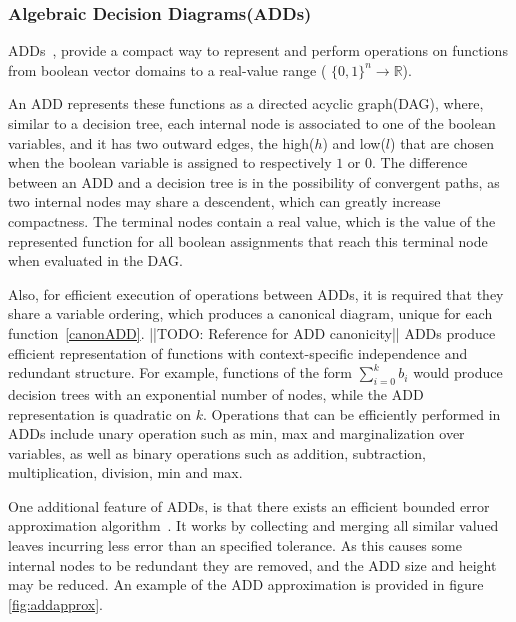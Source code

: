 \subsubsection{Algebraic Decision Diagrams(ADDs)} 

ADDs~\cite{bahar93add}, provide a compact way to represent and perform operations on functions from boolean vector domains to a real-value range ( $\{ 0, 1\}^n \rightarrow \mathbb{R}$). 

An ADD represents these functions as a directed acyclic graph(DAG), where, similar to a decision tree, each internal node is associated to one of the boolean variables, and it has two outward edges, the high($h$) and low($l$) that are chosen when the boolean variable is assigned to respectively $1$ or $0$. The difference between an ADD and a decision tree is in the possibility of convergent paths, as two internal nodes may share a descendent, which can greatly increase compactness. The terminal nodes contain a real value, which is the value of the represented function for all boolean assignments that reach this terminal node when evaluated in the DAG.

 Also, for efficient execution of operations between ADDs, it is required that they share a variable ordering, which produces a canonical diagram, unique for each function~\ref{canonADD}. ||TODO: Reference for ADD canonicity|| ADDs produce efficient representation of functions with context-specific independence and redundant structure. For example, functions of the form $\sum_{i=0}^k b_i$ would produce decision trees with an exponential number of nodes, while the ADD representation is quadratic on $k$. Operations that can be efficiently performed in ADDs include unary operation such as min, max and marginalization over variables, as well as binary operations such as addition, subtraction, multiplication, division, min and max.

One additional feature of ADDs, is that there exists an efficient bounded error approximation algorithm~\cite{apricodd}. It works by collecting and merging all similar valued leaves incurring less error than an specified tolerance. As this causes some internal nodes to be redundant they are removed, and the ADD size and height may be reduced. An example of the ADD approximation is provided in figure \ref{fig:addapprox}.

